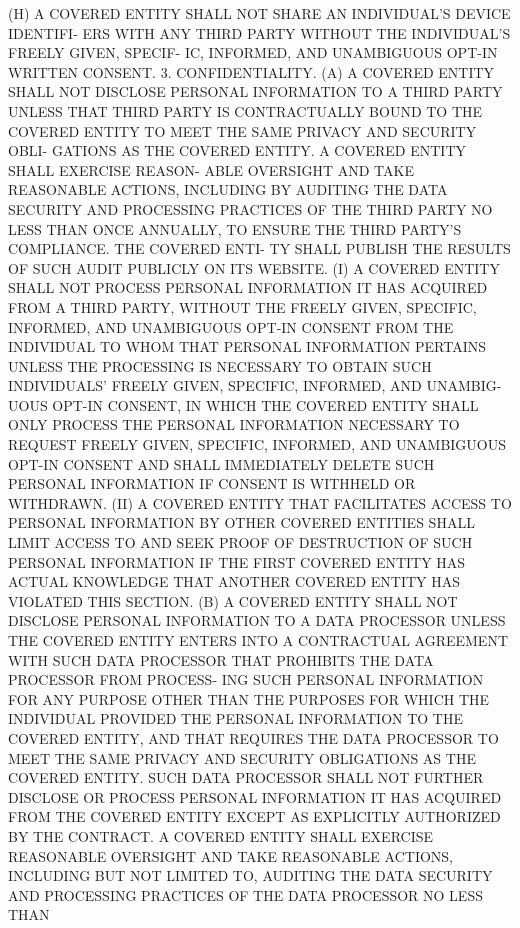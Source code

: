    (H)  A COVERED ENTITY SHALL NOT SHARE AN INDIVIDUAL'S DEVICE IDENTIFI-
 ERS WITH ANY THIRD PARTY WITHOUT THE INDIVIDUAL'S FREELY GIVEN,  SPECIF-
 IC, INFORMED, AND UNAMBIGUOUS OPT-IN WRITTEN CONSENT.
   3.  CONFIDENTIALITY.  (A) A COVERED ENTITY SHALL NOT DISCLOSE PERSONAL
 INFORMATION TO A THIRD PARTY UNLESS THAT THIRD  PARTY  IS  CONTRACTUALLY
 BOUND  TO THE COVERED ENTITY TO MEET THE SAME PRIVACY AND SECURITY OBLI-
 GATIONS AS THE COVERED ENTITY. A COVERED ENTITY SHALL  EXERCISE  REASON-
 ABLE  OVERSIGHT  AND  TAKE REASONABLE ACTIONS, INCLUDING BY AUDITING THE
 DATA SECURITY AND PROCESSING PRACTICES OF THE THIRD PARTY NO  LESS  THAN
 ONCE ANNUALLY, TO ENSURE THE THIRD PARTY'S COMPLIANCE. THE COVERED ENTI-
 TY SHALL PUBLISH THE RESULTS OF SUCH AUDIT PUBLICLY ON ITS WEBSITE.
   (I)  A  COVERED  ENTITY  SHALL NOT PROCESS PERSONAL INFORMATION IT HAS
 ACQUIRED FROM  A  THIRD  PARTY,  WITHOUT  THE  FREELY  GIVEN,  SPECIFIC,
 INFORMED,  AND  UNAMBIGUOUS  OPT-IN  CONSENT FROM THE INDIVIDUAL TO WHOM
 THAT PERSONAL INFORMATION PERTAINS UNLESS THE PROCESSING IS NECESSARY TO
 OBTAIN SUCH INDIVIDUALS' FREELY GIVEN, SPECIFIC, INFORMED, AND  UNAMBIG-
 UOUS  OPT-IN CONSENT, IN WHICH THE COVERED ENTITY SHALL ONLY PROCESS THE
 PERSONAL  INFORMATION  NECESSARY  TO  REQUEST  FREELY  GIVEN,  SPECIFIC,
 INFORMED,  AND  UNAMBIGUOUS  OPT-IN CONSENT AND SHALL IMMEDIATELY DELETE
 SUCH PERSONAL INFORMATION IF CONSENT IS WITHHELD OR WITHDRAWN.
   (II) A COVERED ENTITY THAT FACILITATES ACCESS TO PERSONAL  INFORMATION
 BY  OTHER  COVERED  ENTITIES  SHALL  LIMIT  ACCESS  TO AND SEEK PROOF OF
 DESTRUCTION OF SUCH PERSONAL INFORMATION IF THE FIRST COVERED ENTITY HAS
 ACTUAL KNOWLEDGE THAT ANOTHER COVERED ENTITY HAS VIOLATED THIS SECTION.
   (B) A COVERED ENTITY SHALL NOT DISCLOSE PERSONAL INFORMATION TO A DATA
 PROCESSOR UNLESS THE COVERED ENTITY ENTERS INTO A CONTRACTUAL  AGREEMENT
 WITH SUCH DATA PROCESSOR THAT PROHIBITS THE DATA PROCESSOR FROM PROCESS-
 ING  SUCH  PERSONAL  INFORMATION FOR ANY PURPOSE OTHER THAN THE PURPOSES
 FOR WHICH THE  INDIVIDUAL  PROVIDED  THE  PERSONAL  INFORMATION  TO  THE
 COVERED  ENTITY,  AND  THAT REQUIRES THE DATA PROCESSOR TO MEET THE SAME
 PRIVACY AND SECURITY  OBLIGATIONS  AS  THE  COVERED  ENTITY.  SUCH  DATA
 PROCESSOR  SHALL NOT FURTHER DISCLOSE OR PROCESS PERSONAL INFORMATION IT
 HAS ACQUIRED FROM THE COVERED ENTITY EXCEPT AS EXPLICITLY AUTHORIZED  BY
 THE  CONTRACT.  A COVERED ENTITY SHALL EXERCISE REASONABLE OVERSIGHT AND
 TAKE REASONABLE ACTIONS, INCLUDING BUT NOT LIMITED TO, AUDITING THE DATA
 SECURITY AND PROCESSING PRACTICES OF THE DATA  PROCESSOR  NO  LESS  THAN
